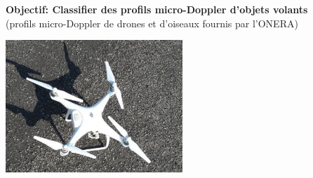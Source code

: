 \documentclass[a0,portrait]{a0poster}
\begin{document}
\begin{multicols}{2} %


\begin{tcolorbox}[colback=blue!5!lime,colframe=green!75!black,title={\section*{Contexte}}]
\textbf{\Large{Objectif: Classifier des profils micro-Doppler d'objets volants}}\\
(profils micro-Doppler de drones et d'oiseaux fournis par l'ONERA)
\begin{center}
    \includegraphics[width=0.5\textwidth]{./Phantom_version1.jpg}
\end{center}
\end{tcolorbox}
\bigskip



\end{multicols}
\end{document}
